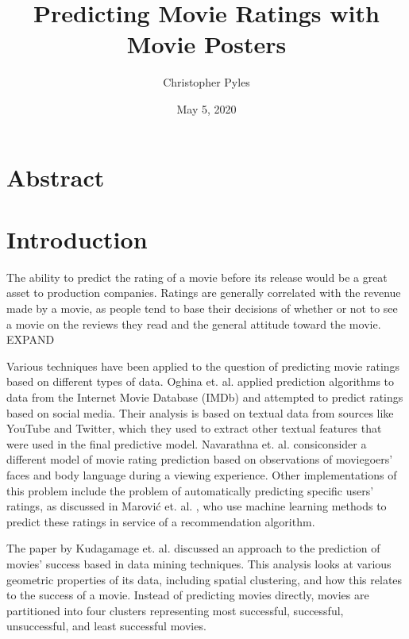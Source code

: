 \documentclass[12pt, oneside]{article}   	%
\title{%
	Predicting Movie Ratings with Movie Posters}
\author{Christopher Pyles}
\date{May 5, 2020}							%
\begin{document}
\maketitle

\section*{Abstract}

\newpage

\tableofcontents

\newpage

\section{Introduction}

The ability to predict the rating of a movie before its release would be a great asset to production companies. Ratings are generally correlated with the revenue made by a movie, as people tend to base their decisions of whether or not to see a movie on the reviews they read and the general attitude toward the movie. EXPAND

Various techniques have been applied to the question of predicting movie ratings based on different types of data. Oghina et. al. \cite{oghina_predicting_2012} applied prediction algorithms to data from the Internet Movie Database (IMDb) and attempted to predict ratings based on social media. Their analysis is based on textual data from sources like YouTube and Twitter, which they used to extract other textual features that were used in the final predictive model. Navarathna et. al. \cite{navarathna_predicting_2014} consiconsider a different model of movie rating prediction based on observations of moviegoers' faces and body language during a viewing experience. Other implementations of this problem include the problem of automatically predicting specific users' ratings, as discussed in Marović et. al. \cite{marovic_automatic_2011}, who use machine learning methods to predict these ratings in service of a recommendation algorithm.

The paper by Kudagamage et. al. \cite{kudagamage_data_2018} discussed an approach to the prediction of movies' success based in data mining techniques. This analysis looks at various geometric properties of its data, including spatial clustering, and how this relates to the success of a movie. Instead of predicting movies directly, movies are partitioned into four clusters representing most successful, successful, unsuccessful, and least successful movies. 
\end{document}
